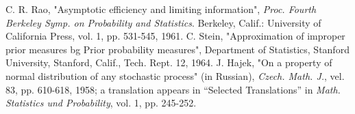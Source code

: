 \documentclass{sbrt2017port}
\begin{document}
\begin{thebibliography}{99}
 C. R. Rao, "Asymptotic efficiency and limiting information", \textit{Proc. Fourth Berkeley Symp. on Probability and Statistics}. Berkeley, Calif.: University of California Press, vol. 1, pp. 531-545, 1961.
 C. Stein, "Approximation of improper prior measures bg Prior probability measures", Department of Statistics, Stanford University, Stanford, Calif., Tech. Rept. 12, 1964.
 J. Hajek, "On a property of normal distribution of any stochastic process" (in Russian), \textit{Czech. Math. J.}, vel. 83, pp. 610-618, 1958; a translation appears in “Selected Translations” in \textit{Math. Statistics und Probability}, vol. 1, pp. 245-252.





\end{thebibliography}

%
%
\end{document}
